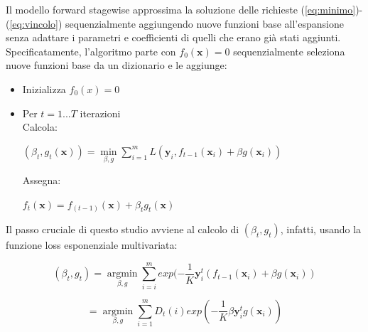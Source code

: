 Il modello forward stagewise approssima la soluzione delle richieste (\ref{eq:minimo})-
(\ref{eq:vincolo}) sequenzialmente 
aggiungendo nuove funzioni base all'espansione senza adattare i parametri e coefficienti di quelli che erano 
gi\`a stati aggiunti. Specificatamente, l'algoritmo parte con \begin{math}
                                                               f_0(\textbf{x}) = 0
                                                              \end{math} sequenzialmente seleziona nuove 
funzioni base da un dizionario e le aggiunge:
\begin{itemize}
 \item Inizializza \begin{math}f_0(x) = 0 \end{math}
\item Per \begin{math}t = 1 ... T \end{math} iterazioni\\
\newline
Calcola:
\begin{center}
 \begin{math} (\beta_t,g_t(\textbf{x})) = \underset{\beta,g}{\operatorname{min}}
\sum_{i=1}^m L(\textbf{y}_i, f_{t-1}(\textbf{x}_i) + \beta g(\textbf{x}_i))
\end{math}
\end{center}
Assegna:
\begin{center}
 \begin{math} f_t(\textbf{x}) = f_{(t-1)}(\textbf{x}) + \beta_t g_t(\textbf{x})
\end{math}
\end{center}
\end{itemize}
Il passo cruciale di questo studio avviene al calcolo di  \begin{math} (\beta_t,g_t)
\end{math}, infatti, usando la funzione loss esponenziale multivariata:
\begin{center}
 \begin{equation} \label{eq:sol1}
(\beta_t,g_t) = \underset{\beta,g}{\operatorname{argmin}} \sum_{i=i}^m exp(
-\frac{1}{K}\textbf{y}_i^t(f_{t-1}(\textbf{x}_i) + \beta g(\textbf{x}_i))\end{equation}
\end{center}
\begin{center}
 \begin{equation}\label{eq:sol2}
= \underset{\beta,g}{\operatorname{argmin}} \sum_{i=1}^m D_t(i) exp(
 -\frac{1}{K}\beta \textbf{y}_i^tg(\textbf{x}_i))
\end{equation}                                                                      
\end{center}
